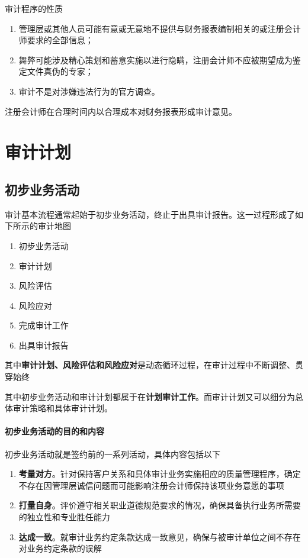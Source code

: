 \documentclass[UTF8,12pt]{ctexart}
\numberwithin{equation}{section} %
\numberwithin{figure}{section}
\numberwithin{table}{section}
\begin{document}
	审计程序的性质
	\begin{enumerate}
		\item 管理层或其他人员可能有意或无意地不提供与财务报表编制相关的或注册会计师要求的全部信息；
		
		\item 舞弊可能涉及精心策划和蓄意实施以进行隐瞒，注册会计师不应被期望成为鉴定文件真伪的专家；
	
		\item 审计不是对涉嫌违法行为的官方调查。
	\end{enumerate}

	
	
	注册会计师在合理时间内以合理成本对财务报表形成审计意见。
	
	\newpage
	\section{审计计划}
	\subsection{初步业务活动}
	审计基本流程通常起始于初步业务活动，终止于出具审计报告。这一过程形成了如下所示的审计地图
	
	\begin{enumerate}
		\item 初步业务活动
		
		\item 审计计划
		
		\item 风险评估
		
		\item 风险应对
		
		\item 完成审计工作
		
		\item 出具审计报告
	\end{enumerate}
	
	其中\textbf{审计计划、风险评估和风险应对}是动态循环过程，在审计过程中不断调整、贯穿始终
	
	其中初步业务活动和审计计划都属于在\textbf{计划审计工作}。而审计计划又可以细分为总体审计策略和具体审计计划。
	
	\paragraph{初步业务活动的目的和内容}
	初步业务活动就是签约前的一系列活动，具体内容包括以下
	\begin{enumerate}
		\item \textbf{考量对方}。针对保持客户关系和具体审计业务实施相应的质量管理程序，确定不存在因管理层诚信问题而可能影响注册会计师保持该项业务意愿的事项
		
		\item \textbf{打量自身}。评价遵守相关职业道德规范要求的情况，确保具备执行业务所需要的独立性和专业胜任能力
		
		\item \textbf{达成一致}。就审计业务约定条款达成一致意见，确保与被审计单位之间不存在对业务约定条款的误解
	\end{enumerate}
	
\end{document}
